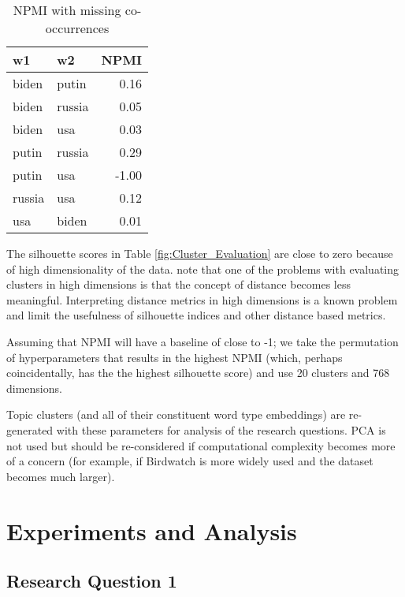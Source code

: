 \documentclass [11pt, proquest] {uwthesis}[2020/02/24]
\begin{document}
\begin{table}
\centering
\caption{NPMI with missing co-occurrences}
\begin{tabular}{llr}
\toprule
    w1 &     w2 &  NPMI \\
\midrule
 biden &  putin &              0.16 \\
 biden & russia &              0.05 \\
 biden &    usa &              0.03 \\
 putin & russia &              0.29 \\
 putin &    usa &             -1.00 \\
russia &    usa &              0.12 \\
   usa &  biden &              0.01 \\
\bottomrule
\end{tabular}
\label{fig:Missing_Pairs}
\end{table}

The silhouette scores in Table \ref{fig:Cluster_Evaluation}  are close to zero because of high dimensionality of the data. \cite{kriegel2009clustering} note that one of the problems with evaluating clusters in high dimensions is that the concept of distance becomes less meaningful.  Interpreting distance metrics in high dimensions is a known problem \cite{tomavsev2016clustering} and limit the usefulness of silhouette indices and other distance based metrics.

Assuming that NPMI will have a baseline of close to -1; we take the permutation of hyperparameters that results in the highest NPMI (which, perhaps coincidentally, has the the highest silhouette score) and use 20 clusters and 768 dimensions.

Topic clusters (and all of their constituent word type embeddings) are re-generated with these parameters for analysis of the research questions. PCA is not used but should be re-considered if computational complexity becomes more of a concern (for example, if Birdwatch is more widely used and the dataset becomes much larger).

\chapter{Experiments and Analysis} \label{section:experiments}

\section{Research Question 1}
\end{document}
